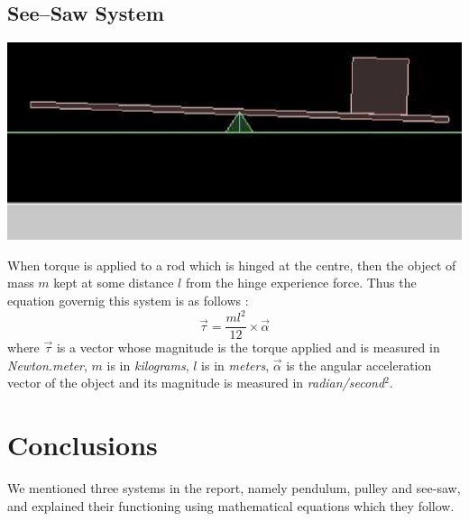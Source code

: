 \documentclass[11pt]{article}
\begin{document}
\subsection{See--Saw System}
\begin{center}
\includegraphics[scale=0.5]{seesaw}
\end{center}
When torque\cite{seesaw} is applied to a rod which is hinged at the centre, then the object of mass $m$ kept at some distance $l$ from the hinge experience force. Thus the equation governig this system is as follows :
\begin{equation}
  \vec{\tau} = \frac{ml^2}{12} \times \vec{\alpha}
\end{equation}
where $\vec{\tau}$ is a vector whose magnitude is the torque applied and is measured in \emph{Newton.meter}, $m$ is in \emph{kilograms}, $l$ is in \emph{meters}, $\vec{\alpha}$ is the angular acceleration vector of the object and its magnitude is measured in \emph{radian/second$^2$}.
\section{Conclusions}
We mentioned three systems in the report, namely pendulum, pulley and see-saw, and explained their functioning using mathematical equations which they follow.


\end{document}

